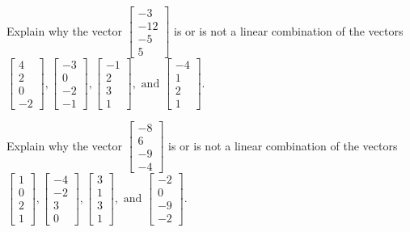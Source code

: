 \documentclass{article}
\begin{document}
\begin{exerciseStatement}
    Explain why the vector \(\left[\begin{array}{c}
-3 \\
-12 \\
-5 \\
5
\end{array}\right]\)  is or is not a linear
combination of the vectors \(\left[\begin{array}{c}
4 \\
2 \\
0 \\
-2
\end{array}\right] , \left[\begin{array}{c}
-3 \\
0 \\
-2 \\
-1
\end{array}\right] , \left[\begin{array}{c}
-1 \\
2 \\
3 \\
1
\end{array}\right] , \text{ and } \left[\begin{array}{c}
-4 \\
1 \\
2 \\
1
\end{array}\right]\).



  
\end{exerciseStatement}

\begin{exerciseStatement}
    Explain why the vector \(\left[\begin{array}{c}
-8 \\
6 \\
-9 \\
-4
\end{array}\right]\)  is or is not a linear
combination of the vectors \(\left[\begin{array}{c}
1 \\
0 \\
2 \\
1
\end{array}\right] , \left[\begin{array}{c}
-4 \\
-2 \\
3 \\
0
\end{array}\right] , \left[\begin{array}{c}
3 \\
1 \\
3 \\
1
\end{array}\right] , \text{ and } \left[\begin{array}{c}
-2 \\
0 \\
-9 \\
-2
\end{array}\right]\).



  
\end{exerciseStatement}
\end{document}
